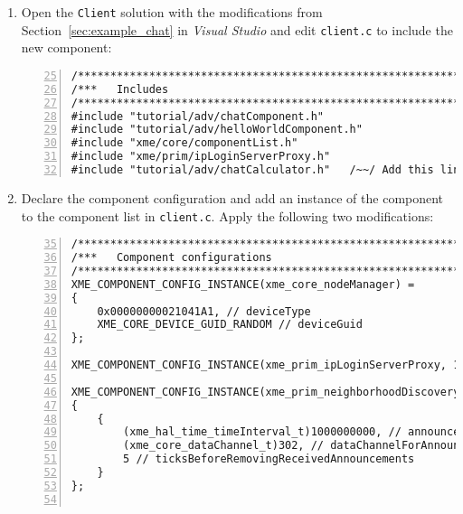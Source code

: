 \begin{enumerate}
\begin{lstlisting}[language=cmake,numbers=left,firstnumber=62]
# Build XME components
xme_link_components(
	"client"
	xme_core_core
	xme_prim_ipLoginServerProxy
	xme_hal_net
	xme_hal_sleep
	tutorial_adv_chatCalculator   ~\char"0023~ Add this line
)
\end{lstlisting}

		Note that CMake will automatically pick up the changes in \verb|CMakeLists.txt| when we perform the next full compile.
		This is why you do not have to rerun CMake manually after this change.

	\item Open the \verb|Client| solution with the modifications from Section~\ref{sec:example_chat} in \emph{Visual Studio}
		and edit \verb|client.c| to include the new component:

	\begin{lstlisting}[numbers=left,firstnumber=25]
/*************************************************************************/
/***   Includes                                                        ***/
/*************************************************************************/
#include "tutorial/adv/chatComponent.h"
#include "tutorial/adv/helloWorldComponent.h"
#include "xme/core/componentList.h"
#include "xme/prim/ipLoginServerProxy.h"
#include "tutorial/adv/chatCalculator.h"   /~~/ Add this line
\end{lstlisting}

	\item Declare the component configuration and add an instance of the component
		to the component list in \verb|client.c|. Apply the following two modifications:

\begin{lstlisting}[numbers=left,firstnumber=35,breaklines]
/*************************************************************************/
/***   Component configurations                                        ***/
/*************************************************************************/
XME_COMPONENT_CONFIG_INSTANCE(xme_core_nodeManager) =
{
	0x00000000021041A1, // deviceType
	XME_CORE_DEVICE_GUID_RANDOM // deviceGuid
};

XME_COMPONENT_CONFIG_INSTANCE(xme_prim_ipLoginServerProxy, 1);

XME_COMPONENT_CONFIG_INSTANCE(xme_prim_neighborhoodDiscovery) =
{
	{
		(xme_hal_time_timeInterval_t)1000000000, // announcementInterval
		(xme_core_dataChannel_t)302, // dataChannelForAnnouncements
		5 // ticksBeforeRemovingReceivedAnnouncements
	}
};


\end{lstlisting}
\end{enumerate}
